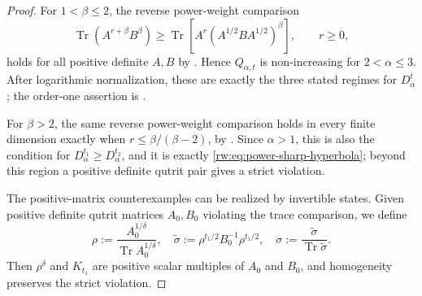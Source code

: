 \documentclass[11pt]{article}
\theoremstyle{remark}
\newcommand{\1}{\mathbbm{1}}
\begin{document}
\begin{proof}
For \underline{$1<\beta\leq2$}, the reverse power-weight comparison
\begin{equation*}
 \operatorname{Tr}(A^{r+\beta}B^\beta)
 \geq
 \operatorname{Tr}\!\left[
 A^r(A^{1/2}BA^{1/2})^\beta\right],
 \qquad r\geq0,
\end{equation*}
holds for all positive definite $A,B$ by
\cite[Theorem~2.1]{shi2026liu}.  Hence $Q_{\alpha,t}$ is
non-increasing for $2<\alpha\leq3$.  After logarithmic normalization,
these are exactly the three stated regimes for $D_\alpha^t$; the
order-one assertion is .

For \underline{$\beta>2$}, the same reverse power-weight comparison holds in every
finite dimension exactly when $r\leq\beta/(\beta-2)$, by
\cite[Theorem~3.3]{vuong2026hyperbolic}.  Since $\alpha>1$, this is
also the condition for $D_\alpha^{t_1}\geq D_\alpha^{t_2}$, and it is
exactly \eqref{rw:eq:power-sharp-hyperbola}; beyond this region a
positive definite qutrit pair gives a strict violation.

The positive-matrix counterexamples can be realized by invertible
states.  Given positive definite qutrit
matrices $A_0,B_0$ violating the trace comparison, we define
\begin{equation}
 \rho:=\frac{A_0^{1/\delta}}{\operatorname{Tr}A_0^{1/\delta}},
 \quad
 \widetilde\sigma:=\rho^{t_1/2}B_0^{-1}\rho^{t_1/2},
 \quad
 \sigma:=\frac{\widetilde\sigma}
 {\operatorname{Tr}\widetilde\sigma}.
 \label{rw:eq:qutrit-state-realization}
\end{equation}
Then $\rho^\delta$ and $K_{t_1}$ are positive scalar multiples
of $A_0$ and $B_0$, and homogeneity preserves the strict
violation.


\end{proof}
\end{document}
